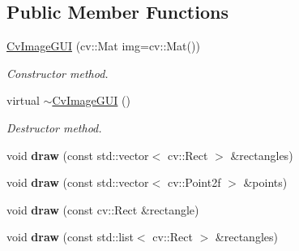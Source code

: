 \subsection*{Public Member Functions}
\begin{DoxyCompactItemize}
\item 
\hypertarget{class_viscv_1_1_cv_image_g_u_i_a906aae50fd4edb5555d10f7d0ae4f906}{}\hyperlink{class_viscv_1_1_cv_image_g_u_i_a906aae50fd4edb5555d10f7d0ae4f906}{Cv\+Image\+G\+U\+I} (cv\+::\+Mat img=cv\+::\+Mat())\label{class_viscv_1_1_cv_image_g_u_i_a906aae50fd4edb5555d10f7d0ae4f906}

\begin{DoxyCompactList}\small\item\em Constructor method. \end{DoxyCompactList}\item 
\hypertarget{class_viscv_1_1_cv_image_g_u_i_aede5851d62dbd49ce5e4974833c387e0}{}virtual \hyperlink{class_viscv_1_1_cv_image_g_u_i_aede5851d62dbd49ce5e4974833c387e0}{$\sim$\+Cv\+Image\+G\+U\+I} ()\label{class_viscv_1_1_cv_image_g_u_i_aede5851d62dbd49ce5e4974833c387e0}

\begin{DoxyCompactList}\small\item\em Destructor method. \end{DoxyCompactList}\item 
\hypertarget{class_viscv_1_1_cv_image_g_u_i_a275ce8772494b98eaf1f08bacd055870}{}void {\bfseries draw} (const std\+::vector$<$ cv\+::\+Rect $>$ \&rectangles)\label{class_viscv_1_1_cv_image_g_u_i_a275ce8772494b98eaf1f08bacd055870}

\item 
\hypertarget{class_viscv_1_1_cv_image_g_u_i_a1fbcf47e959e0c4b227793f4c9e54670}{}void {\bfseries draw} (const std\+::vector$<$ cv\+::\+Point2f $>$ \&points)\label{class_viscv_1_1_cv_image_g_u_i_a1fbcf47e959e0c4b227793f4c9e54670}

\item 
\hypertarget{class_viscv_1_1_cv_image_g_u_i_aee8552ffd73cced2736d5accbc6687a0}{}void {\bfseries draw} (const cv\+::\+Rect \&rectangle)\label{class_viscv_1_1_cv_image_g_u_i_aee8552ffd73cced2736d5accbc6687a0}

\item 
\hypertarget{class_viscv_1_1_cv_image_g_u_i_af02e64519961d07a84cb810f36d61a88}{}void {\bfseries draw} (const std\+::list$<$ cv\+::\+Rect $>$ \&rectangles)\label{class_viscv_1_1_cv_image_g_u_i_af02e64519961d07a84cb810f36d61a88}


\end{DoxyCompactItemize}
